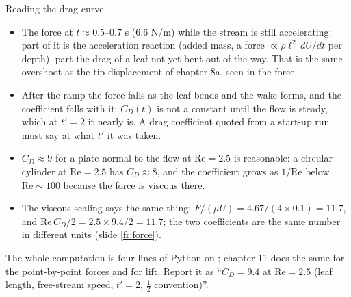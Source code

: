 \documentclass[aspectratio=169,11pt]{beamer}
\begin{document}
\begin{frame}{Reading the drag curve}
\label{fr:cd2}
\footnotesize
\begin{itemize}
  \item The force  at $t \approx 0.5$--$0.7$ s ($6.6$ N/m) while the stream is still accelerating: part of it is the acceleration reaction (added mass, a force $\propto \rho\ell^2\,dU/dt$ per depth), part the drag of a leaf not yet bent out of the way. That is the same overshoot as the tip displacement of chapter 8a, seen in the force.
  \item After the ramp the force falls as the leaf bends and the wake forms, and the coefficient falls with it: $C_D(t)$ is not a constant until the flow is steady, which at $t' = 2$ it nearly is. A drag coefficient quoted from a start-up run must say at what $t'$ it was taken.
  \item $C_D \approx 9$ for a plate normal to the flow at $\mathrm{Re} = 2.5$ is reasonable: a circular cylinder at $\mathrm{Re} = 2.5$ has $C_D \approx 8$, and the coefficient grows as $1/\mathrm{Re}$ below $\mathrm{Re} \sim 100$ because the force is viscous there.
  \item The viscous scaling says the same thing: $F/(\mu U) = 4.67/(4\times0.1) = 11.7$, and $\mathrm{Re}\,C_D/2 = 2.5\times9.4/2 = 11.7$; the two coefficients are the same number in different units (slide \ref{fr:force}).
\end{itemize}
\vspace{1mm}
\begin{punchbox}
\small The whole computation is four lines of Python on ; chapter 11 does the same for the point-by-point forces and for lift. Report it as ``$C_D = 9.4$ at $\mathrm{Re} = 2.5$ (leaf length, free-stream speed, $t' = 2$, $\frac12$ convention)''.
\end{punchbox}
\end{frame}
\end{document}
